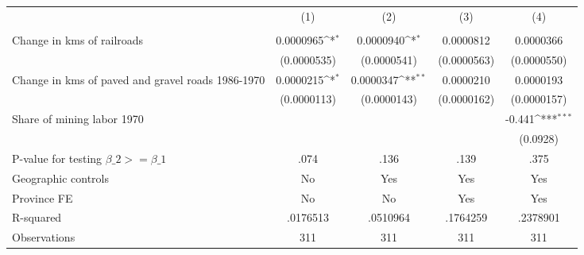 {
\def\sym#1{\ifmmode^{#1}\else\(^{#1}\)\fi}
\begin{tabular}{l*{4}{c}}
\hline\hline
                &\multicolumn{1}{c}{(1)}&\multicolumn{1}{c}{(2)}&\multicolumn{1}{c}{(3)}&\multicolumn{1}{c}{(4)}\\
                &\multicolumn{1}{c}{}&\multicolumn{1}{c}{}&\multicolumn{1}{c}{}&\multicolumn{1}{c}{}\\
\hline
Change in kms of railroads&0.0000965\sym{*}  &0.0000940\sym{*}  &0.0000812         &0.0000366         \\
                &(0.0000535)         &(0.0000541)         &(0.0000563)         &(0.0000550)         \\
[1em]
Change in kms of paved and gravel roads 1986-1970&0.0000215\sym{*}  &0.0000347\sym{**} &0.0000210         &0.0000193         \\
                &(0.0000113)         &(0.0000143)         &(0.0000162)         &(0.0000157)         \\
[1em]
Share of mining labor 1970&                  &                  &                  &   -0.441\sym{***}\\
                &                  &                  &                  & (0.0928)         \\
\hline
P-value for testing $\beta\_{2} >= \beta\_{1}$&     .074         &     .136         &     .139         &     .375         \\
Geographic controls&       No         &      Yes         &      Yes         &      Yes         \\
Province FE     &       No         &       No         &      Yes         &      Yes         \\
R-squared       & .0176513         & .0510964         & .1764259         & .2378901         \\
Observations    &      311         &      311         &      311         &      311         \\
\hline\hline
\end{tabular}
}
